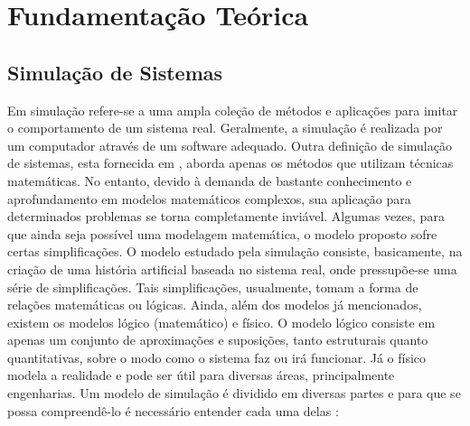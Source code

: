 \documentclass[pt,disc,oneside]{ufscpgeasthesis}
\begin{document}
	\chapter{Fundamentação Teórica}
	\label{cap:fundamentacao}

		\section{Simulação de Sistemas}
		\label{sec:simulacao}

			Em \cite{Distribuicoes} simulação refere-se a uma ampla coleção de métodos e aplicações para imitar o comportamento de um sistema real.
			Geralmente, a simulação é realizada por um computador através de um software adequado.
			Outra definição de simulação de sistemas, esta fornecida em \cite{Freitas}, aborda apenas os métodos que utilizam técnicas matemáticas.
			No entanto, devido à demanda de bastante conhecimento e aprofundamento em modelos matemáticos complexos, sua aplicação para determinados problemas se torna completamente inviável.
			Algumas vezes, para que ainda seja possível uma modelagem matemática, o modelo proposto sofre certas simplificações.
			O modelo estudado pela simulação consiste, basicamente, na criação de uma história artificial baseada no sistema real, onde pressupõe-se uma série de simplificações.
			Tais simplificações, usualmente, tomam a forma de relações matemáticas ou lógicas.
			Ainda, além dos modelos já mencionados, existem os modelos lógico (matemático) e físico.
			O modelo lógico consiste em apenas um conjunto de aproximações e suposições, tanto estruturais quanto quantitativas, sobre o modo como o sistema faz ou irá funcionar.
			Já o físico modela a realidade e pode ser útil para diversas áreas, principalmente engenharias.
			Um modelo de simulação é dividido em diversas partes e para que se possa compreendê-lo é necessário entender cada uma delas \cite{Freitas}:
 
\end{document}
